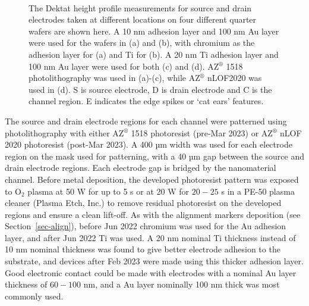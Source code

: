 \documentclass[
  a4paper,
]{scrbook}
\begin{document}
\begin{figure}
\begin{minipage}[t]{0.45\linewidth}
{{}

}

\end{minipage}%
%
\begin{minipage}[t]{0.01\linewidth}

{\centering 

~

}

\end{minipage}%

\caption{\label{fig-electrodes-dektat}The Dektat height profile
measurements for source and drain electrodes taken at different
locations on four different quarter wafers are shown here. A 10 nm
adhesion layer and 100 nm Au layer were used for the wafers in (a) and
(b), with chromium as the adhesion layer for (a) and Ti for (b). A 20 nm
Ti adhesion layer and 100 nm Au layer were used for both (c) and (d).
AZ\(^\circledR\) 1518 photolithography was used in (a)-(c), while
AZ\(^\circledR\) nLOF2020 was used in (d). S is source electrode, D is
drain electrode and C is the channel region. E indicates the edge spikes
or `cat ears' features.}

\end{figure}

The source and drain electrode regions for each channel were patterned
using photolithography with either AZ\(^\circledR\) 1518 photoresist
(pre-Mar 2023) or AZ\(^\circledR\) nLOF 2020 photoresist (post-Mar
2023). A 400 µm width was used for each electrode region on the mask
used for patterning, with a 40 µm gap between the source and drain
electrode regions. Each electrode gap is bridged by the nanomaterial
channel. Before metal deposition, the developed photoresist pattern was
exposed to O\(_2\) plasma at 50 W for up to 5 s or at 20 W for \(20-25\)
s in a PE-50 plasma cleaner (Plasma Etch, Inc.) to remove residual
photoresist on the developed regions and ensure a clean lift-off. As
with the alignment markers deposition (see Section~\ref{sec-align}),
before Jun 2022 chromium was used for the Au adhesion layer, and after
Jun 2022 Ti was used. A 20 nm nominal Ti thickness instead of 10 nm
nominal thickness was found to give better electrode adhesion to the
substrate, and devices after Feb 2023 were made using this thicker
adhesion layer. Good electronic contact could be made with electrodes
with a nominal Au layer thickness of \(60-100\) nm, and a Au layer
nominally 100 nm thick was most commonly used.
\end{document}
